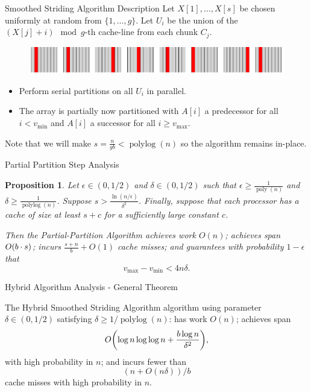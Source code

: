 \documentclass[x11names, svgnames, rgb]{beamer}
\DeclarePairedDelimiter{\paren}{(}{)}
\newcommand{\poly}{\operatorname{poly}}
\newcommand{\polylog}{\operatorname{polylog}}
\newtheorem{proposition}{Proposition}
\begin{document}
\begin{frame}[t]{Smoothed Striding Algorithm Description}
	Let $X[1],\ldots, X[s]$ be chosen uniformly at random from $\{1,\ldots, g\}$. Let $U_i$ be the union of the $(X[j]+i)\mod g$-th cache-line from each chunk $C_j$.
	\begin{figure}
		\includegraphics[width=\linewidth]{imgs/smoothedStridingAlgHighlighted.png}
	\end{figure}
	\begin{itemize}
		\item Perform serial partitions on all $U_i$ in parallel.
		\item The array is partially now partitioned with $A[i]$ a predecessor for all $i < v_{\text{min}}$ and $A[i]$ a successor for all $i \ge v_{\text{max}}$.
	\end{itemize}
	Note that we will make $s = \frac{n}{gb} < \polylog(n)$ so the algorithm remains in-place.
\end{frame}


\begin{frame}[t]{Partial Partition Step Analysis}
\begin{proposition}
  Let $\epsilon \in (0, 1/2)$ and $\delta \in (0, 1/2)$ such that
  $\epsilon \ge \frac{1}{\poly(n)}$ and $\delta \ge
  \frac{1}{\polylog(n)}$. Suppose $s > \frac{\ln
    (n/\epsilon)}{\delta^2}$. Finally, suppose that each processor has
  a cache of size at least $s + c$ for a sufficiently large constant
  $c$.

  Then the Partial-Partition Algorithm achieves work $O(n)$; achieves
  span $O\paren*{b \cdot s}$; incurs $\frac{s+n}{b} + O(1)$ cache
  misses; and guarantees with probability $1 - \epsilon$ that
  $$v_{\text{max}}-v_{\text{min}} < 4 n \delta.$$
\end{proposition}

\end{frame}

\begin{frame}[t]{Hybrid Algorithm Analysis - General Theorem}
\begin{theorem}
	The Hybrid Smoothed Striding Algorithm algorithm using parameter $\delta\in(0,1/2)$ satisfying $\delta \ge 1/\polylog(n)$: has work $O(n)$; achieves span
        $$O\paren*{\log n \log\log n +\frac{b\log n}{\delta^2}},$$
with high probability in $n$; and incurs fewer than 
$$(n+O(n\delta))/b$$
cache misses with high probability in $n$.
\end{theorem}
\end{frame}
\end{document}
